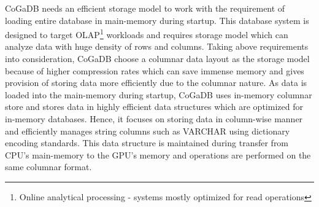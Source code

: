 CoGaDB needs an efficient storage model to work with the requirement of loading entire database in main-memory during startup. This database system is designed to target OLAP\footnote{Online analytical processing - systems mostly optimized for read operations} workloads and requires storage model which can analyze data with huge density of rows and columns.
\newline
Taking above requirements into consideration, CoGaDB choose a columnar data layout as the storage model because of higher compression rates which can save immense memory and gives provision of storing data more efficiently due to the columnar nature. As data is loaded into the main-memory during startup, CoGaDB uses in-memory columnar store and stores data in highly efficient data structures which are optimized for in-memory databases. Hence, it focuses on storing data in column-wise manner and efficiently manages string columns such as VARCHAR using dictionary encoding standards\cite{cogadb_dict_compression}. This data structure is maintained during transfer from CPU's main-memory to the GPU's memory and operations are performed on the same columnar format.